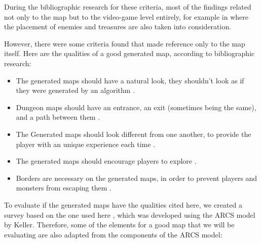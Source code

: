During the bibliographic research for these criteria, most of the findings related not only to the map but to the video-game level entirely, for example in \cite{preuss:2014} where the placement of enemies and treasures are also taken into consideration.

However, there were some criteria found that made reference only to the map itself. Here are the qualities of a good generated map, according to bibliographic research:

\begin{itemize}
\item The generated maps should have a natural look, they shouldn't look as if they were generated by an algorithm \cite{shaker:2016} \cite{adams:2002}.
\item Dungeon maps should have an entrance, an exit (sometimes being the same), and a path between them \cite{shaker:2016}.
\item The Generated maps should look different from one another, to provide the player with an unique experience each time \cite{goncalves:2015} \cite{zapata:2014}.
\item The generated maps should encourage players to explore \cite{ping:2020}.
\item Borders are necessary on the generated maps, in order to prevent players and monsters from escaping them \cite{torrado:2020}.
\end{itemize}

To evaluate if the generated maps have the qualities cited here, we created a survey based on the one used here \cite{carvalho:2016}, which was developed using the ARCS model by Keller. Therefore, some of the elements for a good map that we will be evaluating are also adapted from the components of the ARCS model:

